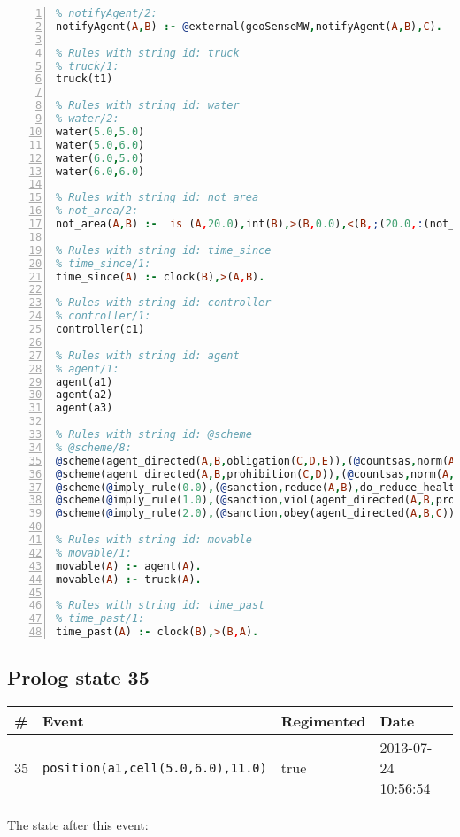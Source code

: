 \documentclass[11pt]{article}\usepackage[utf8]{inputenc}\usepackage{geometry}
\begin{document}
\begin{lstlisting}[language=Prolog, numbers=left]
% Rules with string id: notifyAgent
% notifyAgent/2:
notifyAgent(A,B) :- @external(geoSenseMW,notifyAgent(A,B),C).

% Rules with string id: truck
% truck/1:
truck(t1)

% Rules with string id: water
% water/2:
water(5.0,5.0)
water(5.0,6.0)
water(6.0,5.0)
water(6.0,6.0)

% Rules with string id: not_area
% not_area/2:
not_area(A,B) :-  is (A,20.0),int(B),>(B,0.0),<(B,;(20.0,:(not_area(A,B), is (-(B),20.0)))),int(A),>(A,0.0),<(A,;(20.0,:(area(A,B),-(int(A))))),int(B),>(A,0.0),>(B,0.0),<(A,21.0),<(B,21.0).

% Rules with string id: time_since
% time_since/1:
time_since(A) :- clock(B),>(A,B).

% Rules with string id: controller
% controller/1:
controller(c1)

% Rules with string id: agent
% agent/1:
agent(a1)
agent(a2)
agent(a3)

% Rules with string id: @scheme
% @scheme/8:
@scheme(agent_directed(A,B,obligation(C,D,E)),(@countsas,norm(A,B,F,obligation(C,D,E)),F),false,(listTrue(C)),(time_past(D)),false,[plus(viol(agent_directed(A,B,obligation(C,D,E))))|[]],[plus(obey(agent_directed(A,B,obligation(C,D,E))))|[]])
@scheme(agent_directed(A,B,prohibition(C,D)),(@countsas,norm(A,B,E,prohibition(C,D)),E),(listTrue(C)),false,(false),false,[plus(viol(agent_directed(A,B,prohibition(C,D))))|[]],[plus(obey(agent_directed(A,B,prohibition(C,D))))|[]])
@scheme(@imply_rule(0.0),(@sanction,reduce(A,B),do_reduce_health(A,B),notifyAgent(A,changed(status))),true,false,false,false,[min(reduce(A,B))|[]],[])
@scheme(@imply_rule(1.0),(@sanction,viol(agent_directed(A,B,prohibition(C,D))),do_sanction(D)),true,false,false,false,[min(viol(agent_directed(A,B,prohibition(C,D))))|[]],[])
@scheme(@imply_rule(2.0),(@sanction,obey(agent_directed(A,B,C))),true,false,false,false,[min(obey(agent_directed(A,B,C)))|[]],[])

% Rules with string id: movable
% movable/1:
movable(A) :- agent(A).
movable(A) :- truck(A).

% Rules with string id: time_past
% time_past/1:
time_past(A) :- clock(B),>(B,A).

\end{lstlisting}
\clearpage 
\subsection{Prolog state 35}
\begin{table}[ht]
\centering 
\begin{tabular}{l l l l} 
\textbf{\#} & \textbf{Event} & \textbf{Regimented} & \textbf{Date} \\ [0.5ex] 
\hline
35&\texttt{position(a1,cell(5.0,6.0),11.0)}&true&2013-07-24 10:56:54\\ [1ex] \hline\end{tabular}
\end{table}
The state after this event:
\end{document}
